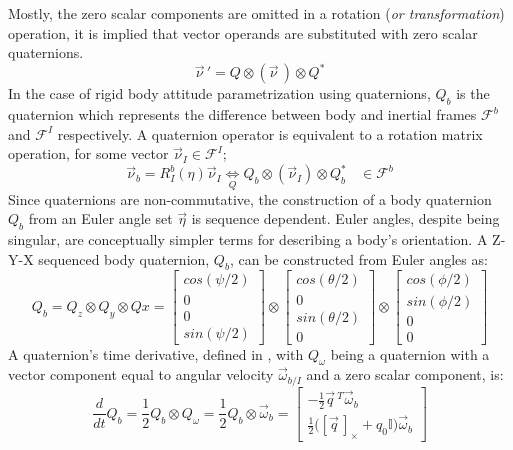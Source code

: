 Mostly, the zero scalar components are omitted in a rotation (\emph{or transformation}) operation, it is implied that vector operands are substituted with zero scalar quaternions.
\begin{equation}\label{eq:quaternion-rotation}
\vec{\nu}\hspace{2pt}'=Q \otimes (\vec{\nu}\hspace{2pt}) \otimes Q^*
\end{equation} 
In the case of rigid body attitude parametrization using quaternions, $Q_b$ is the quaternion which represents the difference between body and inertial frames $\mathcal{F}^b$ and $\mathcal{F}^I$ respectively. A quaternion operator is equivalent to a rotation matrix operation, for some vector $\vec{\nu}_I\in\mathcal{F}^I$;
\begin{equation}
\vec{\nu}_b=R_I^b(\eta)\vec{\nu}_I \underset{Q}{\iff} Q_b \otimes (\vec{\nu}_I) \otimes Q_b^*~~~~\in\mathcal{F}^b
\end{equation}
Since quaternions are non-commutative, the construction of a body quaternion $Q_b$ from an Euler angle set $\vec{\eta}$ is sequence dependent. Euler angles, despite being singular, are conceptually simpler terms for describing a body's orientation. A Z-Y-X sequenced body quaternion, $Q_b$, can be constructed from Euler angles as:
\begin{equation}\label{eq:quaternion-sequence}
Q_b=Q_z\otimes Q_y\otimes Qx=\begin{bmatrix}
cos(\psi/2)\\
0\\
0\\
sin(\psi/2)
\end{bmatrix}
\otimes
\begin{bmatrix}
cos(\theta/2)\\
0\\
sin(\theta/2)\\
0
\end{bmatrix}
\otimes
\begin{bmatrix}
cos(\phi/2)\\
sin(\phi/2)\\
0\\
0
\end{bmatrix}
\end{equation}
A quaternion's time derivative, defined in \cite{quaterniondynamics}, with $Q_\omega$ being a quaternion with a vector component equal to angular velocity $\vec{\omega}_{b/I}$ and a zero scalar component, is:
\begin{equation}\label{eq:quaternion-deriv}
\frac{d}{dt}Q_b=\frac{1}{2}Q_b\otimes Q_{\omega}=\frac{1}{2}Q_b\otimes\vec{\omega}_b=\begin{bmatrix}
-\frac{1}{2}\vec{q}\hspace{2pt}^{T} \vec{\omega}_b\\
\frac{1}{2}\big([\vec{q}\hspace{2pt}]_\times+q_0\mathbb{I}\big)\vec{\omega}_b
\end{bmatrix}
\end{equation}
